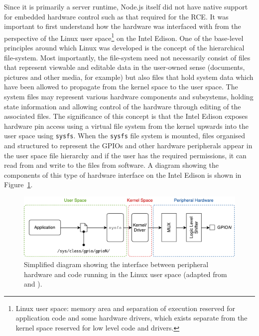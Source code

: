       Since it is primarily a server runtime, Node.js itself did not have native support for embedded hardware control such as that required for the RCE. It was important to first understand how the hardware was interfaced with from the perspective of the Linux user space\footnote{Linux user space: memory area and separation of execution reserved for application code and some hardware drivers, which exists separate from the kernel space reserved for low level code and drivers.} on the Intel Edison. One of the base-level principles around which Linux was developed is the concept of the hierarchical file-system. Most importantly, the file-system need not necessarily consist of files that represent viewable and editable data in the user-owned sense (documents, pictures and other media, for example) but also files that hold system data which have been allowed to propagate from the kernel space to the user space. The system files may represent various hardware components and subsystems, holding state information and allowing control of the hardware through editing of the associated files. The significance of this concept is that the Intel Edison exposes hardware pin access using a virtual file system from the kernel upwards into the user space using \texttt{sysfs}. When the \texttt{sysfs} file system is mounted, files organised and structured to represent the GPIOs and other hardware peripherals appear in the user space file hierarchy and if the user has the required permissions, it can read from and write to the files from software. A diagram showing the components of this type of hardware interface on the Intel Edison is shown in Figure~\ref{fig:softDesign-sysfsExample}.
      
      \begin{figure}[h!]
        \centering
        \includegraphics[width=0.8\linewidth]{figures/softDesign-sysfsExample}
        \caption[Simplified diagram showing the interface between peripheral hardware and code running in the Linux user space.]{Simplified diagram showing the interface between peripheral hardware and code running in the Linux user space (adapted from \cite{fig:softDesign-sysfsExample_cite1} and \cite{fig:softDesign-sysfsExample_cite2}).}
        \label{fig:softDesign-sysfsExample}
      \end{figure}
      
